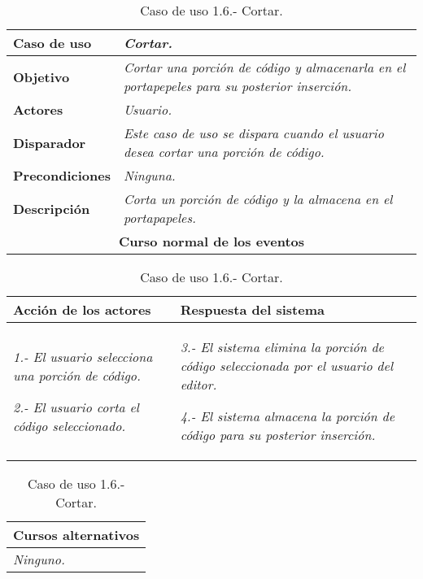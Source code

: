 \documentclass[twoside,a4paper,11pt]{book}
\begin{document}
\begin{table}[!ht]
    \centering
    \begin{tabular}{|p{4cm}|p{11.5cm}|}
    \hline

    \textbf{Caso de uso} & \textit{Cortar.}\\
    \hline

    \textbf{Objetivo} & \textit{Cortar una porción de código y almacenarla en el portapepeles para su posterior inserción.}\\
    \hline

    \textbf{Actores} & \textit{Usuario.}\\
    \hline

    \textbf{Disparador} & \textit{Este caso de uso se dispara cuando el usuario desea cortar una porción de código.}\\
    \hline

    \textbf{Precondiciones} & \textit{Ninguna.}\\
    \hline

    \textbf{Descripción} & \textit{Corta un porción de código y la almacena en el portapapeles.}\\
    \hline

    \multicolumn{2}{|c|}{\textbf{Curso normal de los eventos}}\\
    \hline

    \end{tabular}
    \begin{tabular}{|p{7.75cm}|p{7.75cm}|}
    \hspace{2cm}\textbf{Acción de los actores} & \hspace{1.75cm}\textbf{Respuesta del sistema}\\
    \hline

    \textit{1.- El usuario selecciona una porción de código.}

    \textit{2.- El usuario corta el código seleccionado.}
    &
    \textit{3.- El sistema elimina la porción de código seleccionada por el usuario del editor.}

    \textit{4.- El sistema almacena la porción de código para su posterior inserción.}
    \\
    \hline
    \end{tabular}

    \begin{tabular}{|p{15.9cm}|}
      \hspace{6cm}\textbf{Cursos alternativos}\\
      \hline     
	\textit{Ninguno.}
      \\
      \hline
    \end{tabular}
    \caption{Caso de uso 1.6.- Cortar.}
\end{table}
\end{document}
